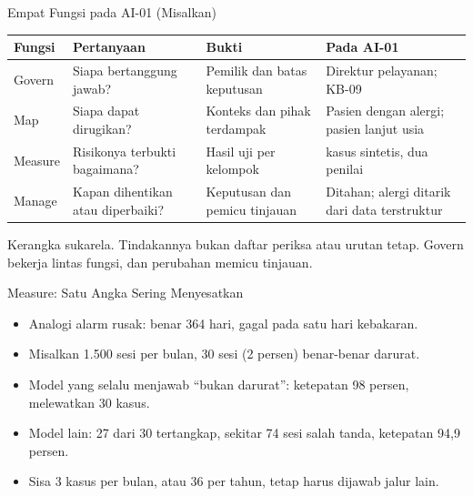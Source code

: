 \documentclass[aspectratio=169, table, 12pt]{beamer}
\begin{document}
\begin{frame}{{\Large Empat Fungsi pada AI-01 (Misalkan)}}
  \vspace{2pt}
  \scriptsize
  \begin{tabularx}{\textwidth}{|>{\raggedright\arraybackslash}p{}|>{\raggedright\arraybackslash}X|>{\raggedright\arraybackslash}X|>{\raggedright\arraybackslash}X|}
    \hline
    \textbf{Fungsi} & \textbf{Pertanyaan} & \textbf{Bukti} & \textbf{Pada AI-01} \\ \hline
    Govern & Siapa bertanggung jawab? & Pemilik dan batas keputusan & Direktur pelayanan; KB-09 \\
    \hline
    Map & Siapa dapat dirugikan? & Konteks dan pihak terdampak & Pasien dengan alergi; pasien
    lanjut usia \\ \hline
    Measure & Risikonya terbukti bagaimana? & Hasil uji per kelompok & 100 kasus sintetis, dua
    penilai \\ \hline
    Manage & Kapan dihentikan atau diperbaiki? & Keputusan dan pemicu tinjauan & Ditahan; alergi
    ditarik dari data terstruktur \\ \hline
  \end{tabularx}

  \vspace{6pt}
  \small Kerangka sukarela. Tindakannya bukan daftar periksa atau urutan tetap. Govern bekerja
  lintas fungsi, dan perubahan memicu tinjauan.
\end{frame}

\begin{frame}{{\Large Measure: Satu Angka Sering Menyesatkan}}
  \vspace{6pt}
  \small
  \begin{itemize}
    \item Analogi alarm rusak: benar 364 hari, gagal pada satu hari kebakaran.
    \item Misalkan 1.500 sesi per bulan, 30 sesi (2 persen) benar-benar darurat.
    \item Model yang selalu menjawab ``bukan darurat'': ketepatan 98 persen, melewatkan 30 kasus.
    \item Model lain: 27 dari 30 tertangkap, sekitar 74 sesi salah tanda, ketepatan 94,9 persen.
    \item Sisa 3 kasus per bulan, atau 36 per tahun, tetap harus dijawab jalur lain.
  \end{itemize}
\end{frame}
\end{document}
